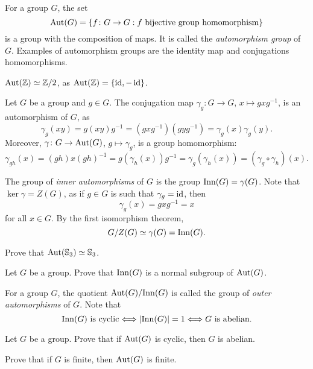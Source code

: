 For a group $G$, 
the set 
\[
\operatorname{Aut}(G)=\{f\colon G\to G:f\text{ bijective group homomorphism}\}
\]
is a group with the composition of maps. It is called 
the \emph{automorphism group} of $G$. 
Examples of automorphism groups are the identity map and 
conjugations homomorphisms. 

\begin{example}
$\operatorname{Aut}(\mathbb{Z})\simeq\mathbb{Z}/2$, as $\operatorname{Aut}(\mathbb{Z})=\{\operatorname{id},-\operatorname{id}\}$.
\end{example}

\begin{example}
Let $G$ be a group and $g\in G$. The conjugation 
map $\gamma_g\colon G\to G$, $x\mapsto gxg^{-1}$,
is an automorphism of $G$, as 
\[
\gamma_g(xy)=g(xy)g^{-1}=(gxg^{-1})(gyg^{-1})=\gamma_g(x)\gamma_g(y).
\]
Moreover, $\gamma\colon G\to\operatorname{Aut}(G)$, $g\mapsto\gamma_g$, is a group
homomorphism:
\[
\gamma_{gh}(x)=(gh)x(gh)^{-1}=g(\gamma_h(x))g^{-1}=\gamma_g(\gamma_h(x))=(\gamma_g\circ\gamma_h)(x).
\]

The group of \emph{inner automorphisms} of $G$ is the 
group 
$\mathrm{Inn}(G)=\gamma(G)$. Note that $\ker\gamma=Z(G)$, as
if $g\in G$ is such that $\gamma_g=\operatorname{id}$, then 
\[
\gamma_g(x)=gxg^{-1}=x
\]
for all $x\in G$. By the first isomorphism theorem, 
\[
G/Z(G)\simeq \gamma(G)=\mathrm{Inn}(G).
\]
\end{example}

\begin{exercise}
\label{xca:aut(S3)}
    Prove that $\operatorname{Aut}(\mathbb{S}_3)\simeq\mathbb{S}_3$. 
\end{exercise}

\begin{exercise}
\label{xca:inner_is_normal}
    Let $G$ be a group. Prove that $\mathrm{Inn}(G)$ is a normal subgroup of $\operatorname{Aut}(G)$. 
\end{exercise} 

For a group $G$, the quotient $\operatorname{Aut}(G)/\mathrm{Inn}(G)$ is called 
the group of \emph{outer automorphisms} of $G$. 
Note that 
\[
\mathrm{Inn}(G)\text{ is cyclic}\Longleftrightarrow
|\mathrm{Inn}(G)|=1\Longleftrightarrow
G\text{ is abelian.}
\]

\begin{exercise}
\label{xca:aut_cyclic}
Let $G$ be a group. 
Prove that if $\operatorname{Aut}(G)$ is cyclic, then 
$G$ is abelian. 
\end{exercise}

\begin{exercise}
\label{xca:aut_finite}
    Prove that if $G$ is finite, then $\operatorname{Aut}(G)$ is finite.
\end{exercise}

